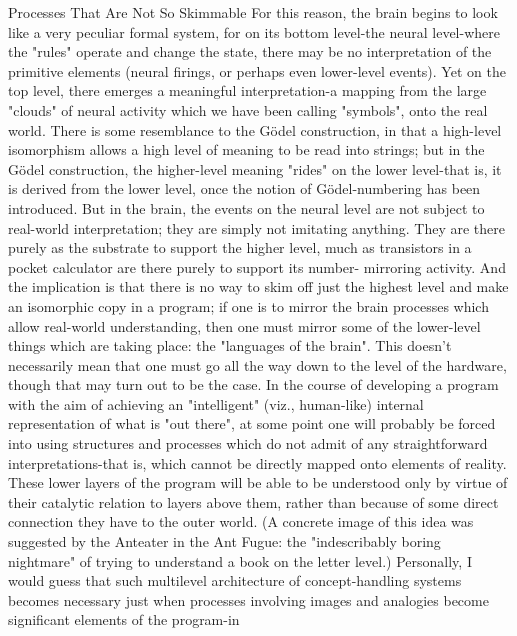 {                     Processes That Are Not So Skimmable
For this reason, the brain begins to look like a very peculiar formal system, for on its
bottom level-the neural level-where the "rules" operate and change the state, there may be
no interpretation of the primitive elements (neural firings, or perhaps even lower-level
events). Yet on the top level, there emerges a meaningful interpretation-a mapping from
the large "clouds" of neural activity which we have been calling "symbols", onto the real
world. There is some resemblance to the Gödel construction, in that a high-level
isomorphism allows a high level of meaning to be read into strings; but in the Gödel
construction, the higher-level meaning "rides" on the lower level-that is, it is derived
from the lower level, once the notion of Gödel-numbering has been introduced. But in the
brain, the events on the neural level are not subject to real-world interpretation; they are
simply not imitating anything. They are there purely as the substrate to support the higher
level, much as transistors in a pocket calculator are there purely to support its number-
mirroring activity. And the implication is that there is no way to skim off just the highest
level and make an isomorphic copy in a program; if one is to mirror the brain processes
which allow real-world understanding, then one must mirror some of the lower-level
things which are taking place: the "languages of the brain". This doesn't necessarily mean
that one must go all the way down to the level of the hardware, though that may turn out
to be the case.
         In the course of developing a program with the aim of achieving an "intelligent"
(viz., human-like) internal representation of what is "out there", at some point one will
probably be forced into using structures and processes which do not admit of any
straightforward interpretations-that is, which cannot be directly mapped onto elements of
reality. These lower layers of the program will be able to be understood only by virtue of
their catalytic relation to layers above them, rather than because of some direct
connection they have to the outer world. (A concrete image of this idea was suggested by
the Anteater in the Ant Fugue: the "indescribably boring nightmare" of trying to
understand a book on the letter level.)
         Personally, I would guess that such multilevel architecture of concept-handling
systems becomes necessary just when processes involving images and analogies become
significant elements of the program-in




}
